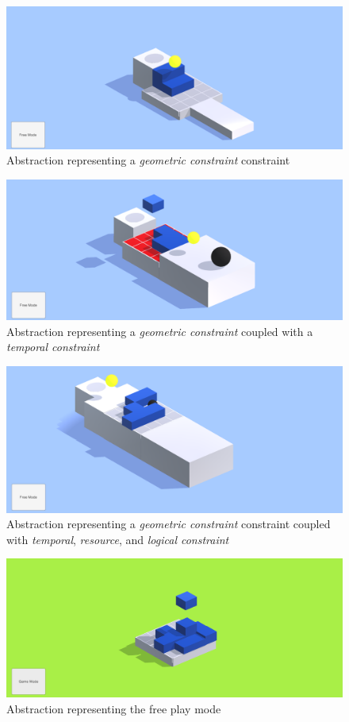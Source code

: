 \documentclass[]{article}
\begin{document}
\begin{figure}
	\includegraphics[width=\textwidth]{figures/GameScrnsht1}
	\caption{Abstraction representing a \emph{geometric constraint} constraint}
	\label{fig:geom}
\end{figure}

\begin{figure}
	\includegraphics[width=\textwidth]{figures/GameScrnsht2}
	\caption{Abstraction representing a \emph{geometric constraint} coupled with a \emph{temporal constraint}}
	\label{fig:temporal}
\end{figure}

\begin{figure}
	\includegraphics[width=\textwidth]{figures/GameScrnsht3}
	\caption{Abstraction representing a \emph{geometric constraint} constraint coupled with \emph{temporal}, \emph{resource}, and \emph{logical constraint}}
	\label{fig:logical}
\end{figure}

\begin{figure}
	\includegraphics[width=\textwidth]{figures/GameScrnsht4}
	\caption{Abstraction representing the free play mode}
	\label{fig:free}
\end{figure}
\end{document}

